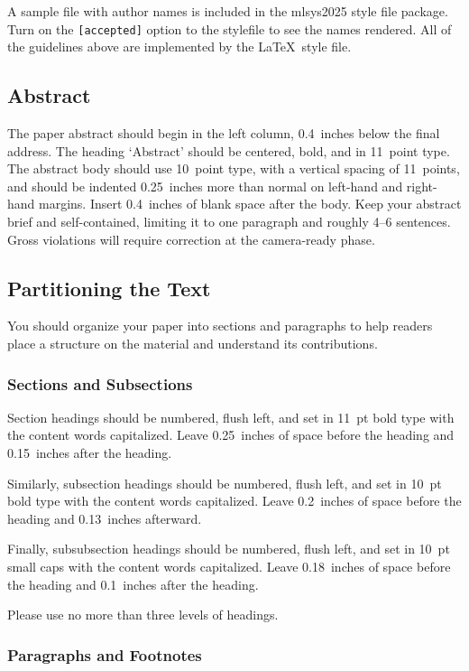 \documentclass{article}
\begin{document}
A sample file with author names is included in the mlsys2025 style file
package. Turn on the \texttt{[accepted]} option to the stylefile to
see the names rendered. All of the guidelines above are implemented
by the \LaTeX\ style file.

\subsection{Abstract}

The paper abstract should begin in the left column, 0.4~inches below the final
address. The heading `Abstract' should be centered, bold, and in 11~point type.
The abstract body should use 10~point type, with a vertical spacing of
11~points, and should be indented 0.25~inches more than normal on left-hand and
right-hand margins. Insert 0.4~inches of blank space after the body. Keep your
abstract brief and self-contained, limiting it to one paragraph and roughly 4--6
sentences. Gross violations will require correction at the camera-ready phase.

\subsection{Partitioning the Text}

You should organize your paper into sections and paragraphs to help
readers place a structure on the material and understand its
contributions.

\subsubsection{Sections and Subsections}

Section headings should be numbered, flush left, and set in 11~pt bold
type with the content words capitalized. Leave 0.25~inches of space
before the heading and 0.15~inches after the heading.

Similarly, subsection headings should be numbered, flush left, and set
in 10~pt bold type with the content words capitalized. Leave
0.2~inches of space before the heading and 0.13~inches afterward.

Finally, subsubsection headings should be numbered, flush left, and
set in 10~pt small caps with the content words capitalized. Leave
0.18~inches of space before the heading and 0.1~inches after the
heading.

Please use no more than three levels of headings.

\subsubsection{Paragraphs and Footnotes}
\end{document}
